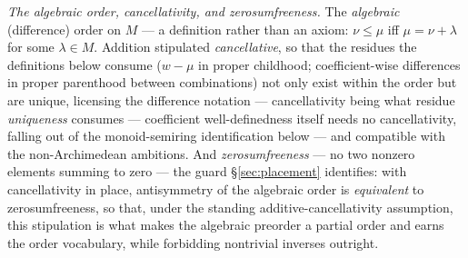 \textit{The algebraic order, cancellativity, and zerosumfreeness.} The \emph{algebraic} (difference) order on $M$ --- a definition rather than an axiom: $\nu \leq \mu$ iff $\mu = \nu + \lambda$ for some $\lambda \in M$. Addition stipulated \emph{cancellative}, so that the residues the definitions below consume ($w - \mu$ in proper childhood; coefficient-wise differences in proper parenthood between combinations) not only exist within the order but are unique, licensing the difference notation --- cancellativity being what residue \emph{uniqueness} consumes --- coefficient well-definedness itself needs no cancellativity, falling out of the monoid-semiring identification below --- and compatible with the non-Archimedean ambitions. And \emph{zerosumfreeness} --- no two nonzero elements summing to zero --- the guard §\ref{sec:placement} identifies: with cancellativity in place, antisymmetry of the algebraic order is \emph{equivalent} to zerosumfreeness, so that, under the standing additive-cancellativity assumption, this stipulation is what makes the algebraic preorder a partial order and earns the order vocabulary, while forbidding nontrivial inverses outright.
